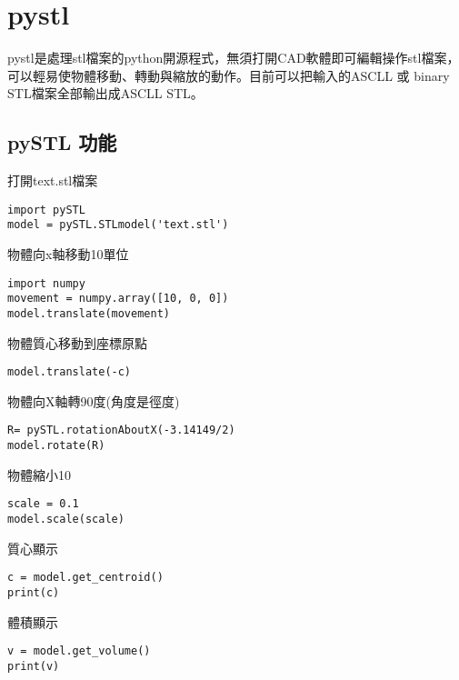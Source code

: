 \chapter{pystl}
 pystl是處理stl檔案的python開源程式，無須打開CAD軟體即可編輯操作stl檔案，可以輕易使物體移動、轉動與縮放的動作。目前可以把輸入的ASCLL 或 binary STL檔案全部輸出成ASCLL STL。\\
 

\section{pySTL 功能}
\item 打開text.stl檔案
\begin{lstlisting}[caption=\Large 輸入檔案]
import pySTL
model = pySTL.STLmodel('text.stl')

\end{lstlisting}
 
\item 物體向x軸移動10單位
 \begin{lstlisting}[caption=\Large 移動]
import numpy
movement = numpy.array([10, 0, 0])
model.translate(movement)

\end{lstlisting}

\item 物體質心移動到座標原點
 \begin{lstlisting}[caption=\Large 移動]
model.translate(-c)

\end{lstlisting}

\item 物體向X軸轉90度(角度是徑度)
 \begin{lstlisting}[caption=\Large 轉動]
R= pySTL.rotationAboutX(-3.14149/2)
model.rotate(R)

\end{lstlisting}

\item 物體縮小10%
 \begin{lstlisting}[caption=\Large 縮放]
scale = 0.1
model.scale(scale)

\end{lstlisting}

\item 質心顯示
 \begin{lstlisting}[caption=\Large 數值]
c = model.get_centroid()
print(c)

\end{lstlisting}

\item 體積顯示
 \begin{lstlisting}[caption=\Large 數值]
v = model.get_volume()
print(v)

\end{lstlisting}

